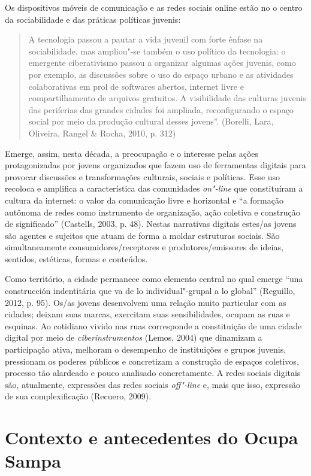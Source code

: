 Os dispositivos móveis de comunicação e as redes sociais online estão no
o centro da sociabilidade e das práticas políticas juvenis:

\begin{quote}
A tecnologia passou a pautar a vida juvenil com forte ênfase na
sociabilidade, mas ampliou"-se também o uso político da tecnologia: o
emergente ciberativismo passou a organizar algumas ações juvenis, como
por exemplo, as discussões sobre o uso do espaço urbano e as atividades
colaborativas em prol de softwares abertos, internet livre e
compartilhamento de arquivos gratuitos. A visibilidade das culturas
juvenis das periferias das grandes cidades foi ampliada, reconfigurando
o espaço social por meio da produção cultural desses jovens''. (Borelli,
Lara, Oliveira, Rangel \& Rocha, 2010, p. 312)
\end{quote}

Emerge, assim, nesta década, a preocupação e o interesse pelas ações
protagonizadas por jovens organizados que fazem uso de ferramentas
digitais para provocar discussões e transformações culturais, sociais e
políticas. Esse uso recoloca e amplifica a característica das
comunidades \emph{on"-line} que constituíram a cultura da internet: o
valor da comunicação livre e horizontal e ``a formação autônoma de redes
como instrumento de organização, ação coletiva e construção de
significado'' (Castells, 2003, p. 48). Nestas narrativas digitais
estes/as jovens são agentes e sujeitos que atuam de forma a moldar
estruturas sociais. São simultaneamente consumidores/receptores e
produtores/emissores de ideias, sentidos, estéticas, formas e conteúdos.

Como território, a cidade permanece como elemento central no qual emerge
``una construcción indentitária que va de lo individual"-grupal a lo
global'' (Reguillo, 2012, p. 95). Os/as jovens desenvolvem uma relação
muito particular com as cidades; deixam suas marcas, exercitam suas
sensibilidades, ocupam as ruas e esquinas. Ao cotidiano vivido nas ruas
corresponde a constituição de uma cidade digital por meio de
\emph{ciberinstrumentos} (Lemos, 2004) que dinamizam a participação
ativa, melhoram o desempenho de instituições e grupos juvenis,
pressionam os poderes públicos e concretizam a construção de espaços
coletivos, processo tão alardeado e pouco analisado concretamente. A
redes sociais digitais são, atualmente, expressões das redes sociais
\emph{off"-line} e, mais que isso, expressão de sua complexificação
(Recuero, 2009).

\section{Contexto e antecedentes do Ocupa Sampa}

